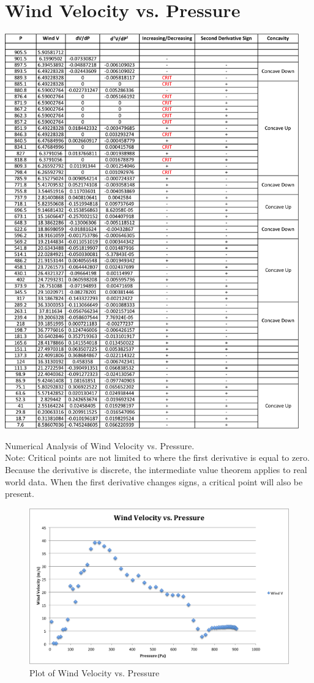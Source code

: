 \documentclass{article}
\begin{document}
\part{Wind Velocity vs. Pressure}
\begin{table}[H]
\centering
\includegraphics[width=5in]{PANDA.png}
\caption{Numerical Analysis of Wind Velocity vs. Pressure.  \\Note: Critical points are not limited to where the first derivative is equal to zero.  Because the derivative is discrete, the intermediate value theorem applies to real world data.  When the first derivative changes signs, a critical point will also be present. }
\end{table}

\begin{figure}[H]
\centering
\includegraphics[width=5in]{IMG1CDATA.png}
\caption{Plot of Wind Velocity vs. Pressure}
\end{figure}
\end{document}
